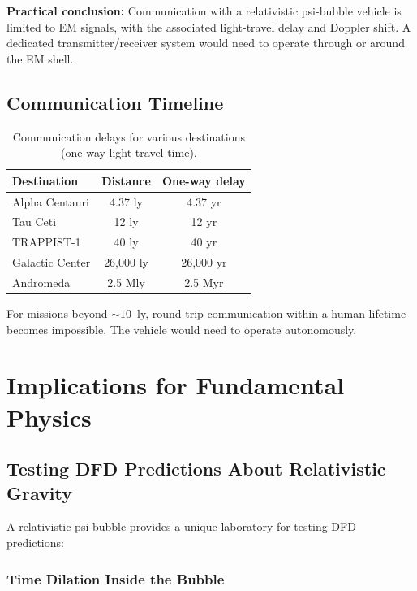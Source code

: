 \documentclass[aps,prd,twocolumn,superscriptaddress,nofootinbib]{revtex4-2}
\begin{document}
\textbf{Practical conclusion:} Communication with a relativistic
psi-bubble vehicle is limited to EM signals, with the associated
light-travel delay and Doppler shift.  A dedicated transmitter/receiver
system would need to operate through or around the EM shell.

\subsection{Communication Timeline}

\begin{table}[H]
\centering
\caption{Communication delays for various destinations (one-way
light-travel time).}
\label{tab:comm-delay}
\begin{tabular}{lcc}
\toprule
\textbf{Destination} & Distance & One-way delay \\
\midrule
Alpha Centauri & 4.37 ly & 4.37 yr \\
Tau Ceti & 12 ly & 12 yr \\
TRAPPIST-1 & 40 ly & 40 yr \\
Galactic Center & 26,000 ly & 26,000 yr \\
Andromeda & 2.5 Mly & 2.5 Myr \\
\bottomrule
\end{tabular}
\end{table}

For missions beyond $\sim 10$~ly, round-trip communication within a
human lifetime becomes impossible.  The vehicle would need to operate
autonomously.

\section{Implications for Fundamental Physics}\label{sec:physics}

\subsection{Testing DFD Predictions About Relativistic Gravity}

A relativistic psi-bubble provides a unique laboratory for testing
DFD predictions:

\subsubsection{Time Dilation Inside the Bubble}
\end{document}
